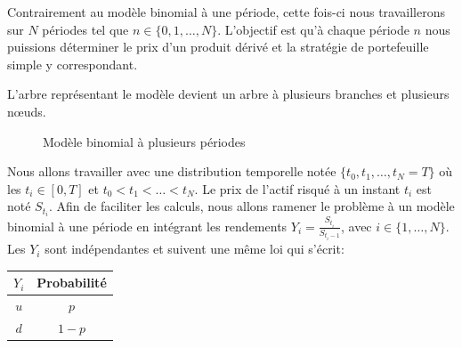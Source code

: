 \documentclass[12pt,a4paper]{report}
\begin{document}
Contrairement au modèle binomial à une période, cette fois-ci nous travaillerons sur $N$ périodes tel que $n \in \{0, 1, \ldots, N\}$. L'objectif est qu'à chaque période $n$ nous puissions déterminer le prix d'un produit dérivé et la stratégie de portefeuille simple y correspondant.

L'arbre représentant le modèle devient un arbre à plusieurs branches et plusieurs nœuds.

\begin{figure}[h]
\centering
{}
\caption{Modèle binomial à plusieurs périodes}
\label{fig:multi_period}
\end{figure}

Nous allons travailler avec une distribution temporelle notée $\{t_0, t_1, \ldots, t_N = T\}$ où les $t_i \in [0, T]$ et $t_0 < t_1 < \ldots < t_N$. Le prix de l'actif risqué à un instant $t_i$ est noté $S_{t_i}$. Afin de faciliter les calculs, nous allons ramener le problème à un modèle binomial à une période en intégrant les rendements $Y_i = \frac{S_{t_i}}{S_{t_i-1}}$, avec $i \in \{1, \ldots, N\}$. Les $Y_i$ sont indépendantes et suivent une même loi qui s'écrit:

\begin{center}
\begin{tabular}{|c|c|}
\hline
$Y_i$ & Probabilité \\
\hline
$u$ & $p$ \\
$d$ & $1-p$ \\
\hline
\end{tabular}
\end{center}
\end{document}
